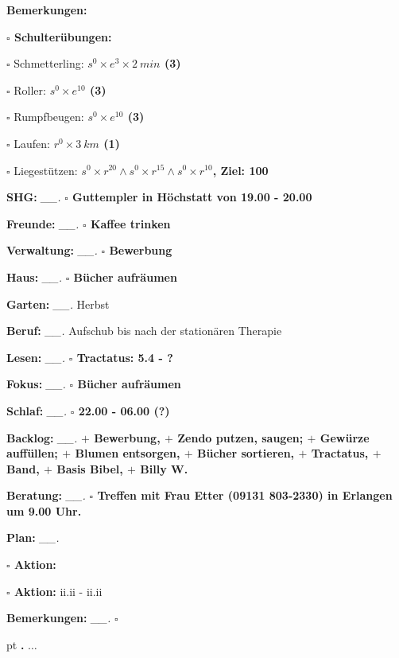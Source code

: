 \documentclass[10pt,a4paper]{article}
\newcounter{notec}
\newcommand\notep[1]{%
  \stepcounter{notec}
  \vskip #1pt
  {\bf\arabic{notec}.}
}
\newcommand\prop[1] {{\color {alizarin} {\bf #1}}}        %
\newcommand\opti[1] {{\color {amethyst} {\bf #1}}}        %
\newcommand\mand[1] {{\color {burntorange} {\bf #1}}}     %
\newcommand\topspace{\vskip -15pt \hskip 20pt}
\newcommand\bottomspace{\vskip 4pt}
\newcommand\n[1] { {\sl #1.} \hskip 5pt }
\begin{document}
\begin{mdframed}[style=daystyle]
\begin{labeling}{{\mand {Bemerkungen:}}}
\begin{minipage}{0.75\textwidth}
\begin{labeling}{\prop {$\square$ {Schulterübungen:}}}
      \item[$\square$ Schmetterling:]   {\prop {$s^0 \times e^3 \times 2\ min$ (3)}}
      \item[$\square$ Roller:]          {\prop {$s^0 \times e^{10}$ (3)}}
      \item[$\square$ Rumpfbeugen:]     {\prop {$s^0 \times e^{10}$ (3)}}
      \item[$\square$ Laufen:]          {\prop {$r^0 \times 3\ km$ (1)}}
      \item[$\square$ Liegestützen:]    {\prop {$s^0 \times r^{20} \land s^0 \times r^{15} \land s^0 \times r^{10}$, Ziel: 100}}
      \end{labeling}
    \end{minipage}
    \bottomspace        
  \item[{\mand {SHG:}}]          \n{\_\_} {\prop {$\square$ Guttempler in Höchstatt von 19.00 - 20.00}}
  \item[{\mand {Freunde:}}]      \n{\_\_} {\prop {$\square$ Kaffee trinken}}
  \item[{\mand {Verwaltung:}}]   \n{\_\_} {\prop {$\square$ Bewerbung}}
  \item[{\mand {Haus:}}]         \n{\_\_} {\prop {$\square$ Bücher aufräumen}}
  \item[{\mand {Garten:}}]       \n{\_\_} Herbst
  \item[{\mand {Beruf:}}]        \n{\_\_} Aufschub bis nach der stationären Therapie
  \item[{\mand {Lesen:}}]        \n{\_\_} {\prop {$\square$ Tractatus: 5.4 - ?}}
  \item[{\mand {Fokus:}}]        \n{\_\_} {\prop {$\square$ Bücher aufräumen}}
  \item[{\mand {Schlaf:}}]       \n{\_\_} {\prop {$\square$ 22.00 - 06.00 (?)}}
  \item[{\mand {Backlog:}}]      \n{\_\_} {\prop {
    $+$ Bewerbung,
    $+$ Zendo putzen, saugen; $+$ Gewürze auffüllen; $+$ Blumen entsorgen, $+$ Bücher sortieren,
    $+$ Tractatus, $+$ Band, $+$ Basis Bibel, $+$ Billy W.}}    
  \item[{\opti {Beratung:}}]     \n{\_\_} {\prop {$\square$ Treffen mit Frau Etter (09131 803-2330) in Erlangen um 9.00 Uhr.}}
  \item[{\mand {Plan:}}]         \n{\_\_}
    \topspace
    \begin{minipage}{0.75\textwidth}  
      \begin{labeling}{\prop {$\square$ {Aktion:}}} 
        \setlength\itemsep{-3pt}
      \item[{\prop {$\square$ Aktion:}}]  ii.ii - ii.ii
      \end{labeling}
    \end{minipage}
    \bottomspace
  \item[{\mand {Bemerkungen:}}]  \n{\_\_} {\prop {$\square$}}
  \end{labeling}
    
  \setcounter{notec}{0}
  
  \notep 0 $\ldots$
\end{mdframed}
\end{document}
